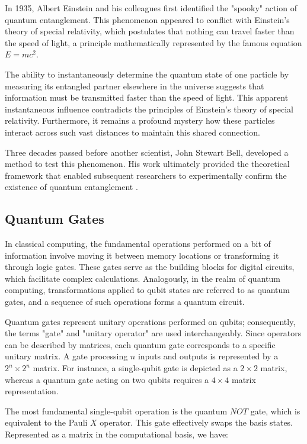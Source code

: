\documentclass[en]{dimscthesis}
\begin{document}
In 1935, Albert Einstein and his colleagues first identified the "spooky" action of quantum entanglement. This phenomenon appeared to conflict with Einstein’s theory of special relativity, which postulates that nothing can travel faster than the speed of light, a principle mathematically represented by the famous equation \(E=mc^2\).

The ability to instantaneously determine the quantum state of one particle by measuring its entangled partner elsewhere in the universe suggests that information must be transmitted faster than the speed of light. This apparent instantaneous influence contradicts the principles of Einstein’s theory of special relativity. Furthermore, it remains a profound mystery how these particles interact across such vast distances to maintain this shared connection.

Three decades passed before another scientist, John Stewart Bell, developed a method to test this phenomenon. His work ultimately provided the theoretical framework that enabled subsequent researchers to experimentally confirm the existence of quantum entanglement \cite{bib:nasa}. 

\subsection{Quantum Gates} \label{qgates}

In classical computing, the fundamental operations performed on a bit of information involve moving it between memory locations or transforming it through logic gates. These gates serve as the building blocks for digital circuits, which facilitate complex calculations. Analogously, in the realm of quantum computing, transformations applied to qubit states are referred to as quantum gates, and a sequence of such operations forms a quantum circuit.

Quantum gates represent unitary operations performed on qubits; consequently, the terms "gate" and "unitary operator" are used interchangeably. Since operators can be described by matrices, each quantum gate corresponds to a specific unitary matrix. A gate processing $n$ inputs and outputs is represented by a $2^n \times 2^n$ matrix. For instance, a single-qubit gate is depicted as a $2 \times 2$ matrix, whereas a quantum gate acting on two qubits requires a $4 \times 4$ matrix representation.

The most fundamental single-qubit operation is the quantum $NOT$ gate, which is equivalent to the Pauli $X$ operator. This gate effectively swaps the basis states. Represented as a matrix in the computational basis, we have:
\end{document}

